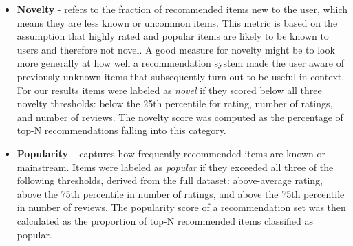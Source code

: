 \documentclass[\myFontSize,a4paper,oneside,hidelinks]{article}
\begin{document}
\begin{itemize}
\item \textbf{Novelty} - refers to the fraction of recommended items new to the user, which means they are less known or uncommon items. This metric is based on the assumption that highly rated and popular items are likely to be known to users and therefore not novel. A good measure for novelty might be to look more generally at how well a recommendation system made the user aware of previously unknown items that subsequently turn out to be useful in context.\cite{Avazpour2014245}\\
For our results items were labeled as \textit{novel} if they scored below all three novelty thresholds: below the 25th percentile for rating, number of ratings, and number of reviews. The novelty score was computed as the percentage of top-N recommendations falling into this category.

\item \textbf{Popularity} – captures how frequently recommended items are known or mainstream. Items were labeled as \textit{popular} if they exceeded all three of the following thresholds, derived from the full dataset: above-average rating, above the 75th percentile in number of ratings, and above the 75th percentile in number of reviews. The popularity score of a recommendation set was then calculated as the proportion of top-N recommended items classified as popular.



\end{itemize}

\end{document}
